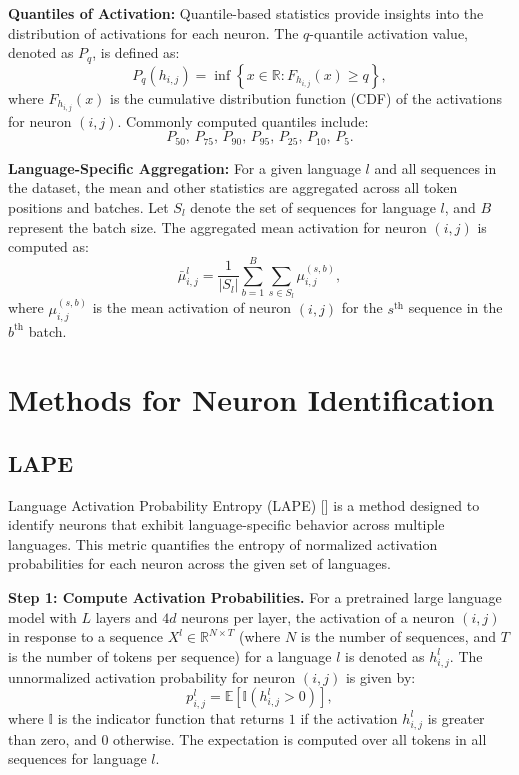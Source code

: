 \textbf{Quantiles of Activation:} Quantile-based statistics provide insights into the distribution of activations for each neuron. The $q$-quantile activation value, denoted as $P_q$, is defined as:
\begin{equation}
P_q(h_{i,j}) = \inf \left\{x \in \mathbb{R} : F_{h_{i,j}}(x) \geq q \right\},
\end{equation}
where $F_{h_{i,j}}(x)$ is the cumulative distribution function (CDF) of the activations for neuron $(i, j)$. Commonly computed quantiles include:
\[
P_{50}, \, P_{75}, \, P_{90}, \, P_{95}, \, P_{25}, \, P_{10}, \, P_{5}.
\]

\textbf{Language-Specific Aggregation:} For a given language $l$ and all sequences in the dataset, the mean and other statistics are aggregated across all token positions and batches. Let $S_l$ denote the set of sequences for language $l$, and $B$ represent the batch size. The aggregated mean activation for neuron $(i, j)$ is computed as:
\begin{equation}
\bar{\mu}_{i,j}^l = \frac{1}{|S_l|} \sum_{b=1}^B \sum_{s \in S_l} \mu_{i,j}^{(s,b)},
\end{equation}
where $\mu_{i,j}^{(s,b)}$ is the mean activation of neuron $(i, j)$ for the $s^\text{th}$ sequence in the $b^\text{th}$ batch.

\section {Methods for Neuron Identification}

\subsection{LAPE}

Language Activation Probability Entropy (LAPE) [\cite{tang2024languagespecific}] is a method designed to identify neurons that exhibit language-specific behavior across multiple languages. This metric quantifies the entropy of normalized activation probabilities for each neuron across the given set of languages.

\textbf{Step 1: Compute Activation Probabilities.} 
For a pretrained large language model with $L$ layers and $4d$ neurons per layer, the activation of a neuron $(i, j)$ in response to a sequence $X^l \in \mathbb{R}^{N \times T}$ (where $N$ is the number of sequences, and $T$ is the number of tokens per sequence) for a language $l$ is denoted as $h_{i,j}^l$. The unnormalized activation probability for neuron $(i, j)$ is given by:
\begin{equation}
	p_{i,j}^l = \mathbb{E}\left[\mathbb{I}\left(h_{i,j}^l > 0\right)\right],
\end{equation}
where $\mathbb{I}$ is the indicator function that returns $1$ if the activation $h_{i,j}^l$ is greater than zero, and $0$ otherwise. The expectation is computed over all tokens in all sequences for language $l$.

